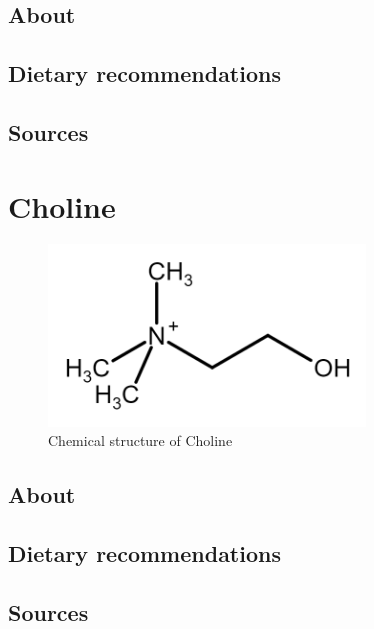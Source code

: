 \documentclass{book}
\begin{document}
\section{About}


\section{Dietary recommendations}


\section{Sources}


\chapter{Choline}
\begin{figure}[h]
	\caption{Chemical structure of Choline}
	\centering \includegraphics[width=0.75\textwidth]{images/Choline_chemical_structure}
\end{figure}
\newpage

\section{About}


\section{Dietary recommendations}


\section{Sources}


\listoffigures


\listoftables
\end{document}
